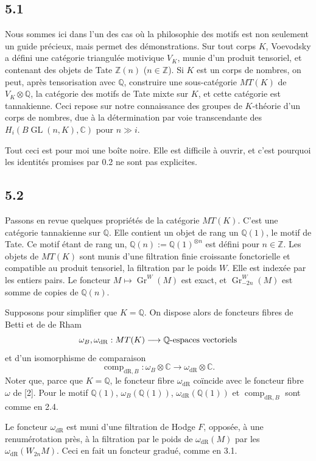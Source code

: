 \documentclass[10pt]{article}
\newcommand{\Q}{\mathbb Q}
\newcommand{\Z}{\mathbb Z}
\newcommand{\C}{\mathbb C}
\newcommand{\GL}{\operatorname{GL}}
\newcommand{\Gr}{\operatorname{Gr}}
\newcommand{\comp}{\operatorname{comp}}
\newcommand{\dR}{\mathrm{dR}}
\begin{document}
\subsection*{5.1}
Nous sommes ici dans l'un des cas où la philosophie des motifs est non seulement un guide précieux, mais permet des démonstrations. Sur tout corps $K$, Voevodsky a défini une catégorie triangulée motivique $V_K$, munie d'un produit tensoriel, et contenant des objets de Tate $\Z(n)$ ($n\in\Z$). Si $K$ est un corps de nombres, on peut, après tensorisation avec $\Q$, construire une sous-catégorie $MT(K)$ de $V_K\otimes\Q$, la catégorie des motifs de Tate mixte sur $K$, et cette catégorie est tannakienne. Ceci repose sur notre connaissance des groupes de $K$-théorie d'un corps de nombres, due à la détermination par voie transcendante des $H_i(B\GL(n,K),\C)$ pour $n\gg i$.

Tout ceci est pour moi une boîte noire. Elle est difficile à ouvrir, et c'est pourquoi les identités promises par 0.2 ne sont pas explicites.

\subsection*{5.2}
Passons en revue quelques propriétés de la catégorie $MT(K)$. C'est une catégorie tannakienne sur $\Q$. Elle contient un objet de rang un $\Q(1)$, le motif de Tate. Ce motif étant de rang un, $\Q(n):=\Q(1)^{\otimes n}$ est défini pour $n\in\Z$. Les objets de $MT(K)$ sont munis d'une filtration finie croissante fonctorielle et compatible au produit tensoriel, la filtration par le poids $W$. Elle est indexée par les entiers pairs. Le foncteur $M\mapsto\Gr^W(M)$ est exact, et $\Gr^W_{-2n}(M)$ est somme de copies de $\Q(n)$.

Supposons pour simplifier que $K=\Q$. On dispose alors de foncteurs fibres de Betti et de de Rham
\[
 \omega_B,\omega_{\dR}:MT(K)\longrightarrow \Q\hbox{-espaces vectoriels}
\]
et d'un isomorphisme de comparaison
\[
 \comp_{\dR,B}:\omega_B\otimes\C\longrightarrow\omega_{\dR}\otimes\C.
\]
Noter que, parce que $K=\Q$, le foncteur fibre $\omega_{\dR}$ coïncide avec le foncteur fibre $\omega$ de [2]. Pour le motif $\Q(1)$, $\omega_B(\Q(1))$, $\omega_{\dR}(\Q(1))$ et $\comp_{\dR,B}$ sont comme en 2.4.

Le foncteur $\omega_{\dR}$ est muni d'une filtration de Hodge $F$, opposée, à une renumérotation près, à la filtration par le poids de $\omega_{\dR}(M)$ par les $\omega_{\dR}(W_{2n}M)$. Ceci en fait un foncteur gradué, comme en 3.1.
\end{document}
